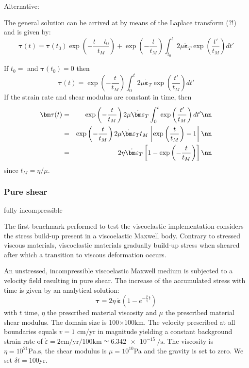 \vspace{1cm}
Alternative:

The general solution can be arrived at  
by means of the Laplace transform (?!) and is given by: 
\[
{\bm \tau}(t) = {\bm \tau}(t_0) \exp\left( -\frac{t-t_0}{t_M} \right) + \exp \left(-\frac{t}{t_M}\right)
\int_{t_0}^{t} 2 \mu \dot{\bm \varepsilon}_T  \exp \left(\frac{t'}{t_M}\right) dt'
\]

If $t_0=$ and ${\bm \tau}(t_0)=0$ then
\[
{\bm \tau}(t) =  \exp \left(-\frac{t}{t_M}\right)
\int_{0}^{t} 2 \mu \dot{\bm \varepsilon}_T  \exp \left( \frac{t'}{t_M} \right) dt'
\]
If the strain rate and shear modulus are constant in time, then 
\begin{eqnarray}
{\bm \tau}(t) 
&=&  \exp \left(-\frac{t}{t_M}\right)
2 \mu \dot{\bm \varepsilon}_T   \int_{0}^{t} \exp \left( \frac{t'}{t_M} \right) dt' \nn\\
&=&  \exp \left(-\frac{t}{t_M}\right)
2 \mu \dot{\bm \varepsilon}_T  t_M  \left[ \exp \left( \frac{t}{t_M} \right) -1  \right] \nn\\
&=& 
2 \eta \dot{\bm \varepsilon}_T   \left[ 1 - \exp \left( -\frac{t}{t_M} \right)\right] \nn
\end{eqnarray}
since $t_M=\eta/\mu$.






















\subsubsection{Pure shear}


{\color{orange} fully incompressible}

The first benchmark performed to test the viscoelastic implementation considers the stress
build-up present in a viscoelastic Maxwell body. Contrary to stressed viscous materials,
viscoelastic materials gradually build-up stress when sheared after which a transition to viscous deformation occurs.

An unstressed, incompressible viscoelastic Maxwell medium is subjected to a velocity field
resulting in pure shear.
The increase of the accumulated stress with time is given by an analytical solution:
\begin{equation}
{\bm \tau} = 2\eta\ {\dot{\bm \varepsilon}} \left ( 1-e^{-\frac{\mu }{\eta} t } \right )
\end{equation}
with $t$ time, $\eta$ the prescribed material viscosity and $\mu$ the prescribed material shear modulus.
The domain size is 100$\times 100$km.
The velocity prescribed at all boundaries equals $v=1$ cm/yr in magnitude yielding a constant
background strain rate of $\dot{\varepsilon}=2\text{cm/yr}/100\text{km}\simeq \SI{6.342e-15}{\per\second}$.
The viscosity is $\eta= 10^{21}\text{Pa.s}$, the shear modulus is
$\mu =10^{10}$Pa and the gravity is set to zero. We set $\delta t=100$yr.


